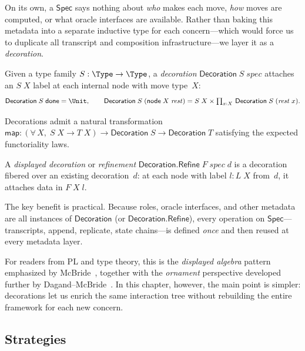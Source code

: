 On its own, a $\mathsf{Spec}$ says nothing about \emph{who} makes each move,
\emph{how} moves are computed, or what oracle interfaces are available.  Rather
than baking this metadata into a separate inductive type for each concern---which
would force us to duplicate all transcript and composition infrastructure---we
layer it as a \emph{decoration}.

\begin{definition}[Decoration]
  \label{int:decoration}
  Given a type family $S : \Type \to \Type$, a \emph{decoration}
  $\mathsf{Decoration}\;S\;\mathit{spec}$ attaches an $S\;X$ label at each
  internal node with move type~$X$:
  \[
    \mathsf{Decoration}\;S\;\mathsf{done} = \Unit, \qquad
    \mathsf{Decoration}\;S\;(\mathsf{node}\;X\;\mathit{rest}) =
      S\;X \times \textstyle\prod_{x : X}\,
        \mathsf{Decoration}\;S\;(\mathit{rest}\;x).
  \]
\end{definition}

Decorations admit a natural transformation $\mathsf{map} :
(\forall\,X,\; S\;X \to T\;X) \to \mathsf{Decoration}\;S \to
\mathsf{Decoration}\;T$ satisfying the expected functoriality laws.

\begin{definition}
  \label{int:decoration-refine}
  A \emph{displayed decoration} or \emph{refinement}
  $\mathsf{Decoration.Refine}\;F\;\mathit{spec}\;d$ is a decoration fibered
  over an existing decoration~$d$: at each node with label $l : L\;X$ from~$d$,
  it attaches data in $F\;X\;l$.
\end{definition}

The key benefit is practical.  Because roles, oracle interfaces, and other
metadata are all instances of $\mathsf{Decoration}$ (or
$\mathsf{Decoration.Refine}$), every operation on $\mathsf{Spec}$---transcripts,
append, replicate, state chains---is defined \emph{once} and then reused at
every metadata layer.

For readers from PL and type theory, this is the \emph{displayed algebra}
pattern emphasized by McBride~\cite{McBride2010}, together with the
\emph{ornament} perspective developed further by
Dagand--McBride~\cite{DagandMcBride2014}.  In this chapter, however, the main
point is simpler: decorations let us enrich the same interaction tree without
rebuilding the entire framework for each new concern.

\subsection{Strategies}

